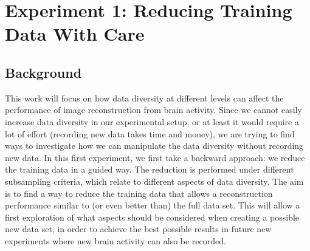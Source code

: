 \section{Experiment 1: Reducing Training Data With Care}


\subsection{Background}

This work will focus on how data diversity at different levels can affect the performance of image reconstruction from  brain activity. Since we cannot easily increase data diversity in our experimental setup, or at least it would require a lot of effort (recording new data takes time and money), we are trying to find ways to investigate how we can manipulate the data diversity  without recording new data. In this first experiment, we first take a backward approach: we reduce the training data in a guided way. The reduction is performed under different subsampling criteria, which relate to different aspects of data diversity. The aim is to find a way to reduce the training data that allows a reconstruction performance similar to (or even better than) the full data set. This will allow a first exploration of what aspects should be considered when creating a possible new data set, in order to achieve the best possible results in future new experiments where new brain activity can also be recorded. 

